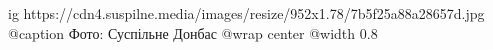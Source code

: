  
 
 
 
 

\ifcmt
  ig https://cdn4.suspilne.media/images/resize/952x1.78/7b5f25a88a28657d.jpg
	@caption Фото: Суспільне Донбас
  @wrap center
  @width 0.8
\fi
